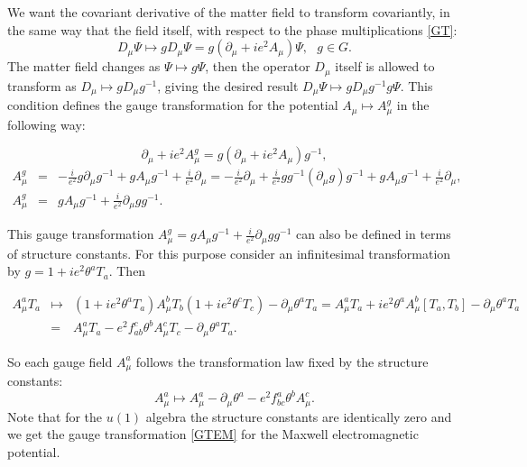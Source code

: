 \documentclass[11pt]{report}
\theoremstyle{plain}
\theoremstyle{definition}
\theoremstyle{remark}
\theoremstyle{remark}
\numberwithin{equation}{section}
\begin{document}
We want the covariant derivative of the matter field to transform covariantly, in the same way that the field itself, with respect to the phase multiplications \eqref{GT}:
%
\begin{equation}
 D_{\mu} \Psi \mapsto  g D_{\mu}\Psi = g (\partial_{\mu} + i e^2 A_{\mu})\Psi, \,\,\, \, g\in G.
 \end{equation}
 The matter field changes as $\Psi \mapsto g\Psi$, then the operator $D_{\mu}$ itself is allowed to transform as $D_{\mu} \mapsto gD_{\mu}g^{-1}$, giving the desired result $D_{\mu}\Psi \mapsto gD_{\mu}g^{-1}g\Psi$. 
 This condition defines the gauge transformation for the potential $A_{\mu} \mapsto A_{\mu}^g$ in the following way:
 \begin{spacing}{1.45}
 $$\partial_{\mu} + i e^2 A_{\mu}^g = g(\partial_{\mu} + i e^2 A_{\mu})g^{-1},$$
\begin{equation}\label{YMGT}
 \begin{array}{lll} 
 A_{\mu}^g & = & -\frac{i}{e^2}g\partial_{\mu}g^{-1} + g A_{\mu}g^{-1} +\frac{i}{e^2} \partial_{\mu} = -\frac{i}{e^2}\partial_{\mu} + \frac{i}{e^2}gg^{-1}(\partial_{\mu}g)g^{-1} + g A_{\mu}g^{-1} +\frac{i}{e^2}\partial_{\mu},\\
 A_{\mu}^g &=& g A_{\mu}g^{-1} + \frac{i}{e^2}\partial_{\mu}gg^{-1}.
 \end{array}
 \end{equation}
\end{spacing} 

 
 This gauge transformation $A_{\mu}^g = g A_{\mu}g^{-1} + \frac{i}{e^2}\partial_{\mu}gg^{-1}$ can also be defined in terms of structure constants. 
 For this purpose consider an infinitesimal transformation by $g = 1+ie^2\theta^a T_a$. Then 
 \begin{spacing}{1.45}
$\begin{array}{lll}
 A_{\mu}^a T_a & \mapsto  & (1+ie^2\theta^a T_a) A_{\mu}^b T_b (1+ie^2\theta^c T_c) - \partial_{\mu} \theta^aT_a =  A_{\mu}^a T_a + ie^2\theta^aA_{\mu}^b[ T_a, T_b] -\partial_{\mu} \theta^aT_a\\
& =&  A_{\mu}^a T_a -e^2 f_{ab}^c\theta^bA_{\mu}^cT_c - \partial_{\mu} \theta^a T_a.
\end{array}$
\end{spacing} 
So each gauge field $A^a_{\mu}$ follows the transformation law fixed by the structure constants:
%
\begin{equation}
 A_{\mu}^a  \mapsto A_{\mu}^a   - \partial_{\mu} \theta^a - e^2 f^a_{bc}\theta^bA_{\mu}^c.
 \end{equation}
 Note that for the $u(1)$ algebra the structure constants are identically zero and we get the gauge transformation \eqref{GTEM} for the Maxwell electromagnetic potential.
 
\end{document}
